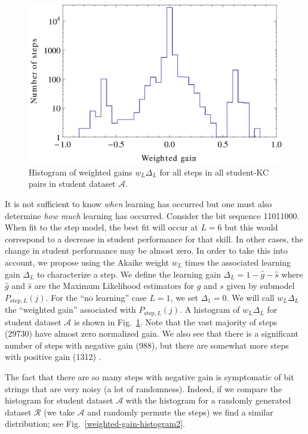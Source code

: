 \documentclass{acmlarge-edm}
\begin{document}
\begin{figure}
  \centering \includegraphics{weighted-gain-histogram.eps}
   \caption{Histogram of weighted gains $w_L \Delta_L$ for
     all steps in all student-KC pairs in student dataset $\mathcal{A}$.}
    \label{weighted-gain-histogram}
\end{figure}

It is not sufficient to know {\it when} learning has occurred but 
one must also determine {\it how much} learning has occurred.  
Consider the bit sequence 11011000.   When fit to the step model,  
the best fit will occur at $L=6$ but this would correspond to a
decrease in student performance for that skill.  In other cases, the 
change in student performance may be almost zero.  
In order to take this into account, we propose 
using the Akaike weight $w_L$ times the associated learning gain $\Delta_L$
to characterize a step.
We define the learning gain $\Delta_L=1-\hat{g}-\hat{s}$ where $\hat{g}$ and $\hat{s}$
are the Maximum Likelihood estimators for $g$ and $s$ given
by submodel  $P_{\mathrm{step},L}(j)$.   For the ``no learning''
case $L=1$, we set $\Delta_1=0$.
We will call  $w_L \Delta_L$ the ``weighted gain'' associated with 
$P_{\mathrm{step},L}(j)$.
A histogram of $w_L \Delta_L$ for student dataset $\mathcal{A}$ is
shown in Fig.~\ref{weighted-gain-histogram}.  Note that the vast
majority of steps (29730) have almost zero normalized gain.  
We also see that there
is a significant number of steps with negative gain (988),
but there are somewhat more steps with positive gain (1312) .

The fact that there are so many steps with negative gain is
symptomatic of bit strings that are very noisy (a lot of
randomness).  Indeed, if we compare the histogram for student
dataset $\mathcal{A}$ with the histogram for a randomly 
generated dataset $\mathcal{R}$ (we take $\mathcal{A}$ and
randomly permute the steps) we find a similar distribution;
see Fig.~\ref{weighted-gain-histogram2}.
\end{document}
